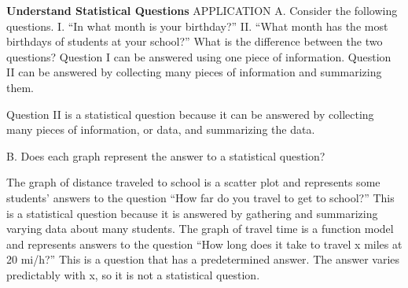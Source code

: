 \documentclass{article}
\newenvironment{example}[1]{}{}         %
\newcommand{\answer}[1]{}               %
\newcommand{\placeholder}[2]{}          %
\newcommand{\te}[1]{}                   %
\begin{document}
\begin{example}{1}
\textbf{Understand Statistical Questions}
APPLICATION
A. Consider the following questions.
I. ``In what month is your birthday?''
II. ``What month has the most birthdays of students at your school?''
What is the difference between the two questions?
Question I can be answered using one piece of information.
Question II can be answered by collecting many pieces of information and summarizing them.
\te{Callout: Question I could be asked as part of an investigation into Question II. But a specific interview question is different from the general statistical question the investigation is trying to answer.}
Question II is a statistical question because it can be answered by collecting many pieces of information, or data, and summarizing the data.
\answer{A. Question I can be answered using one piece of information. Question II can be answered by collecting many pieces of information and summarizing them.}
\te{STUDY TIP The answers to statistical questions can be summarized in different types of displays such as bar graphs, line graphs, scatter plots, and frequency charts.}
B. Does each graph represent the answer to a statistical question?
\placeholder{graph}{Distance Traveled to School. Red scatter points; horizontal Student Age (y), labels 0,10,20,30 with grid every 5; vertical Distance (mi), labels 0 through 6 every 1. Positive-axis arrows. Approximate points (5,0.5),(6,0.7),(7,0.2),(8,0.5),(8,1),(9,3),(10,1.2),(11,2),(12,3),(13,2.5),(14,4),(15,0.5),(15,2.5),(15,5),(16,1.7),(16,4.2),(16,6),(17,2.3),(17,5),(18,3.4),(18,4).}
\placeholder{graph}{Travel Time at 20 mi/h Average Speed. Red filled points (k/3,k), k=0 through 18, on an increasing straight pattern. Horizontal Distance (mi) 0 through 6 with labeled ticks every 2 and grid every 1; vertical Time (min) 0 through 18 every 3; positive-axis arrows.}
The graph of distance traveled to school is a scatter plot and represents some students' answers to the question ``How far do you travel to get to school?'' This is a statistical question because it is answered by gathering and summarizing varying data about many students.
The graph of travel time is a function model and represents answers to the question ``How long does it take to travel x miles at 20 mi/h?'' This is a question that has a predetermined answer. The answer varies predictably with x, so it is not a statistical question.
\answer{B. The graph of distance traveled to school represents a statistical question; the graph of travel time does not.}
\te{COMMON ERROR The word ``data'' is a plural noun, so use it with plural verbs like ``these data are'' or ``the data indicate.'' However, ``set'' and ``value'' are singular, so use singular verbs for them, like ``this data set is'' or ``the data value is.''}
\end{example}
\end{document}
